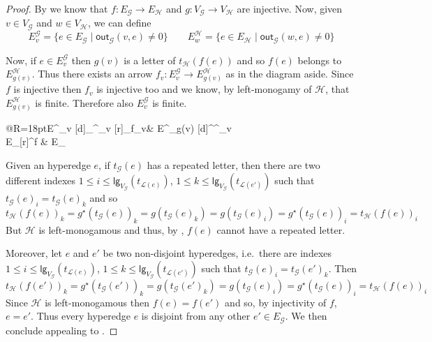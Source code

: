 \documentclass[3p]{elsarticle}
\newcommand{\lgh}{\mathsf{lg}}
\newcommand{\outd}[1]{\mathsf{out}_{\mathcal{#1}}}
\theoremstyle{remark}
\theoremstyle{definition}
\begin{document}
\cnt*
\begin{proof}\label{proof:count}
	By  we know that $f\colon E_{\mathcal{G}}\to E_{\mathcal{H}}$ and $g\colon V_{\mathcal{G}}\to V_\mathcal{H}$ are injective. Now, given $v\in V_{\mathcal{G}}$ and $w\in V_{\mathcal{H}}$, we can define
	\[E^{\mathcal{G}}_v=\{e\in E_{\mathcal{G}} \mid \outd{G}(v,e) \neq 0\} \qquad E^{\mathcal{H}}_w=\{e\in E_{\mathcal{H}} \mid \outd{G}(w,e) \neq 0\}\]
	
	\noindent 
			\begin{minipage}[r]{.8\linewidth}
					\setlength{\parindent}{1.5em}
		Now, if $e\in E^{\mathcal{G}}_v$ then $g(v)$ is a letter of $t_{\mathcal{H}}(f(e))$ and so $f(e)$ belongs to $E^{\mathcal{H}}_{g(v)}$. Thus there exists an arrow $f_v\colon  E^{\mathcal{G}}_v\to E^{\mathcal{H}}_{g(v)} $ as in the diagram aside. Since $f$ is injective then $f_{v}$ is injective too and we know, by left-monogamy of $\mathcal{H}$, that $E^{\mathcal{H}}_{g(v)}$ is finite. Therefore also $E^{\mathcal{G}}_v$ is finite.
	\end{minipage}
	\hfill 
	\begin{minipage}[r]{.2\linewidth} \vspace{-.3cm}
		\xymatrix@C=40pt@R=18pt{E^{}_v \ar@{>->}[d]_{\iota^{}_v} [r]_{f_v}& E^{}_{g(v)} \ar@{>->}[d]^{\iota^{}_v} \\ E_{}\ar@{>->}[r]^{f} & E_{}}
	\end{minipage}

	Given an hyperedge $e$, if $t_{\mathcal{G}}(e)$ has a repeated letter, then there are two different indexes $1\leq i \leq \lgh_{V_{\mathcal{G}}}(t_{\mathcal{L}(e)})$, $1\leq k \leq \lgh_{V_{\mathcal{G}}}(t_{\mathcal{L}(e')}) $ such that $t_{\mathcal{G}}(e)_i=t_{\mathcal{G}}(e)_k$ and so
\[t_{\mathcal{H}}(f(e))_k=g^\star(t_{\mathcal{G}}(e))_k=g(t_{\mathcal{G}}(e)_k)=g(t_{\mathcal{G}}(e)_i)=g^\star(t_{\mathcal{G}}(e))_i=t_{\mathcal{H}}(f(e))_i \]
But $\mathcal{H}$ is left-monogamous and thus, by , $f(e)$ cannot have a repeated letter.

	Moreover, let $e$ and $e'$ be two non-disjoint hyperedges, i.e.~there are indexes $1\leq i \leq \lgh_{V_{\mathcal{G}}}(t_{\mathcal{L}(e)})$, $1\leq k \leq \lgh_{V_{\mathcal{G}}}(t_{\mathcal{L}(e')}) $ such that $t_{\mathcal{G}}(e)_i=t_{\mathcal{G}}(e') _k$. Then
\[t_{\mathcal{H}}(f(e'))_k=g^\star(t_{\mathcal{G}}(e'))_k=g(t_{\mathcal{G}}(e')_k)=g(t_{\mathcal{G}}(e)_i)=g^\star(t_{\mathcal{G}}(e))_i=t_{\mathcal{H}}(f(e))_i \]
%
Since $\mathcal{H}$ is left-monogamous then $f(e)=f(e')$ and so, by injectivity of $f$, $e = e'$. Thus every hyperedge $e$ is disjoint from any other $e'\in E_{\mathcal{G}}$. We then conclude appealing to .
\end{proof}
\end{document}
